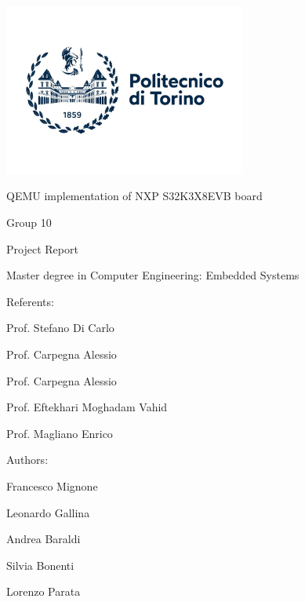 \documentclass[10pt,  english, makeidx, a4paper, titlepage, oneside]{book}
\begin{document}
\frontmatter
\begin{titlepage}
\vspace{0cm}
\centerline{
\includegraphics[width=0.6\textwidth]{./polito_logo.jpg}} 
\vspace{0.5cm}
\centerline{\huge\sf QEMU implementation of NXP S32K3X8EVB board}
\vspace{1cm}
\centerline{\Huge\sf Group 10}
\bigskip
\centerline{\huge\sf Project Report}
\vspace{1cm}
\centerline{\Large Master degree in Computer Engineering: Embedded Systems}
\vspace{2.5cm}
%
{\large Referents:}

Prof. Stefano Di Carlo

Prof. Carpegna Alessio 

Prof. Carpegna Alessio

Prof. Eftekhari Moghadam Vahid

Prof. Magliano Enrico


\bigskip
\vspace{1cm}
%
%
{\large Authors:}
%
%

Francesco Mignone

Leonardo Gallina 

Andrea Baraldi

Silvia Bonenti

Lorenzo Parata
%
\begin{center}
\end{center}
\end{titlepage}



\tableofcontents

\mainmatter
%    
%

% 
% 
% 
% 
% 
% 
%
%    
%
\appendix

% 
%
\end{document}
